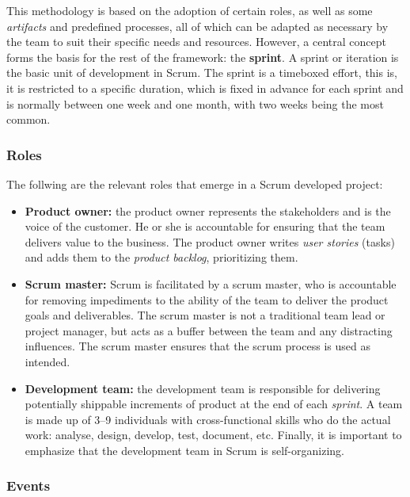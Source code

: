 This methodology is based on the adoption of certain roles, as well as some \textit{artifacts} and predefined processes, all of which can be adapted as necessary by the team to suit their specific needs and resources. However, a central concept forms the basis for the rest of the framework: the \textbf{sprint}. A sprint or iteration is the basic unit of development in Scrum. The sprint is a timeboxed effort, this is, it is restricted to a specific duration, which is fixed in advance for each sprint and is normally between one week and one month, with two weeks being the most common.

\subsubsection*{Roles}

The follwing are the relevant roles that emerge in a Scrum developed project:

\begin{itemize}
	\item
	\textbf{Product owner:} the product owner represents the stakeholders and is the voice of the customer. He or she is accountable for ensuring that the team delivers value to the business. The product owner writes \textit{user stories} (tasks) and adds them to the \textit{product backlog}, prioritizing them.
	
	\item
	\textbf{Scrum master:} Scrum is facilitated by a scrum master, who is accountable for removing impediments to the ability of the team to deliver the product goals and deliverables. The scrum master is not a traditional team lead or project manager, but acts as a buffer between the team and any distracting influences. The scrum master ensures that the scrum process is used as intended.
	
	\item
	\textbf{Development team:} the development team is responsible for delivering potentially shippable increments of product at the end of each \textit{sprint}. A team is made up of 3–9 individuals with cross-functional skills who do the actual work: analyse, design, develop, test, document, etc. Finally, it is important to emphasize that the development team in Scrum is self-organizing.
\end{itemize}

\subsubsection*{Events}

